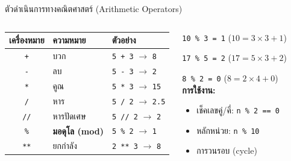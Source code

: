 \documentclass[11pt, aspectratio=169]{beamer}
\newcommand{\py}[1]{\texttt{#1}}
\begin{document}
\begin{frame}{ตัวดำเนินการทางคณิตศาสตร์ (Arithmetic Operators)}
  \begin{columns}[T]
      \begin{explanation}
        \begin{tabular}{c|l|l}
          \textbf{เครื่องหมาย} & \textbf{ความหมาย} & \textbf{ตัวอย่าง} \\
          \hline
          \py{+}  & บวก     & \py{5 + 3} $\rightarrow$ \py{8} \\
          \py{-}  & ลบ      & \py{5 - 3} $\rightarrow$ \py{2} \\
          \py{*}  & คูณ     & \py{5 * 3} $\rightarrow$ \py{15} \\
          \py{/}  & หาร      & \py{5 / 2} $\rightarrow$ \py{2.5} \\
          \py{//} & หารปัดเศษ & \py{5 // 2} $\rightarrow$ \py{2} \\
          \py{\%} & \textbf{มอดุโล (mod)} & \py{5 \% 2} $\rightarrow$ \py{1} \\
          \py{**} & ยกกำลัง  & \py{2 ** 3} $\rightarrow$ \py{8} \\
        \end{tabular}
      \end{explanation}
      \begin{exambox}
        \py{10 \% 3 = 1} \quad ($10 = 3\times3 + 1$)

        \py{17 \% 5 = 2} \quad ($17 = 5\times3 + 2$)

        \py{8 \% 2 = 0} \quad ($8 = 2\times4 + 0$)\\

        \textbf{การใช้งาน:}
        \begin{itemize}
          \item เช็คเลขคู่/คี่: \py{n \% 2 == 0}
          \item หลักหน่วย: \py{n \% 10}
          \item การวนรอบ (cycle)
        \end{itemize}
      \end{exambox}
  \end{columns}
\end{frame}
\end{document}

